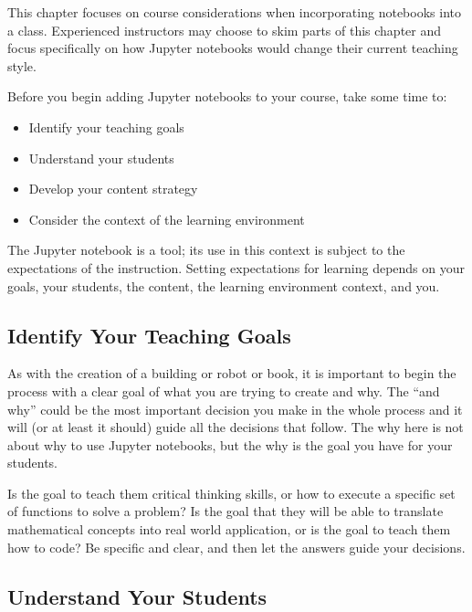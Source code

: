 \documentclass[]{book}
\providecommand{\tightlist}{%
  \setlength{\itemsep}{0pt}\setlength{\parskip}{0pt}}
\begin{document}
This chapter focuses on course considerations when incorporating notebooks into
a class. Experienced instructors may choose to skim parts of this chapter and
focus specifically on how Jupyter notebooks would change their current teaching
style.

Before you begin adding Jupyter notebooks to your course, take some time to:

\begin{itemize}
\tightlist
\item
  Identify your teaching goals
\item
  Understand your students
\item
  Develop your content strategy
\item
  Consider the context of the learning environment
\end{itemize}

The Jupyter notebook is a tool; its use in this context is subject to the
expectations of the instruction. Setting expectations for learning depends on
your goals, your students, the content, the learning environment context, and
you.

\hypertarget{identify-your-teaching-goals}{%
\subsection{Identify Your Teaching Goals}\label{identify-your-teaching-goals}}

As with the creation of a building or robot or book, it is important to begin
the process with a clear goal of what you are trying to create and why. The ``and
why'' could be the most important decision you make in the whole process and it
will (or at least it should) guide all the decisions that follow. The why here
is not about why to use Jupyter notebooks, but the why is the goal you have for
your students.

Is the goal to teach them critical thinking skills, or how to execute a specific
set of functions to solve a problem? Is the goal that they will be able to
translate mathematical concepts into real world application, or is the goal to
teach them how to code? Be specific and clear, and then let the answers guide
your decisions.

\hypertarget{understand-your-students}{%
\subsection{Understand Your Students}\label{understand-your-students}}
\end{document}
